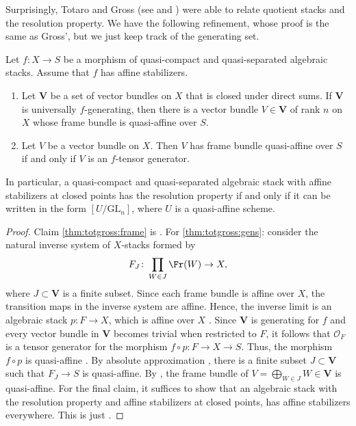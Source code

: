 \documentclass[reqno,a4paper]{amsart}
\numberwithin{Theorem}{section}
\newcommand{\Orb}{\mathcal{O}}
\newcommand{\Vect}{\mathbf{V}}
\renewcommand{\GL}{\mathrm{GL}}
\theoremstyle{plain}
\theoremstyle{remark}
\begin{document}
Surprisingly, Totaro and Gross (see \cite[Thm.\ 1.1]{MR2108211} and
\cite[Thm.\ 1.1, Thm.\ 6.10]{2013arXiv1306.5418G}) were able to relate
quotient stacks and the resolution property. We have the following
refinement, whose proof is the same as Gross', but we just keep track of
the generating set.
\begin{Theorem} \label{thm:totgross} Let $f \colon X \to S$ be a
  morphism of quasi-compact and quasi-separated algebraic
  stacks. Assume that $f$ has affine stabilizers.
  \begin{enumerate}
  \item  \label{thm:totgross:gens} Let $\Vect$ be a set of vector bundles on $X$ that is closed
    under direct sums. If $\Vect$ is universally $f$-generating, then there is a
    vector bundle $V\in \Vect$ of rank $n$ on $X$ whose frame bundle
    is quasi-affine over $S$. 
  \item \label{thm:totgross:frame} Let $V$ be a vector bundle on
    $X$. Then $V$ has frame bundle quasi-affine over $S$ if and only
    if $V$ is an $f$-tensor generator.
  \end{enumerate}
In particular, a quasi-compact and quasi-separated
    algebraic stack with affine stabilizers at closed points has the resolution
    property if and only if it can be written in the form $[U/\GL_n]$,
    where $U$ is a quasi-affine scheme.
\end{Theorem}
\begin{proof}
  Claim \eqref{thm:totgross:frame} is \cite[Thm.\
  6.4]{2013arXiv1306.5418G}. For \eqref{thm:totgross:gens}: consider the
  natural inverse system of $X$-stacks formed by
  \[
    F_J\colon \prod_{W \in J} \Fr(W) \to X,
  \]
  where $J \subset \Vect$ is a finite subset. Since each frame bundle
  is affine over $X$, the transition maps in the inverse system are
  affine. Hence, the inverse limit is an algebraic stack
  $p\colon F \to X$, which is affine over $X$ \cite[Thm.\
  C(i)]{rydh-2009}. Since $\Vect$ is generating for $f$ and every
  vector bundle in $\Vect$ becomes trivial when restricted to $F$, it
  follows that $\Orb_F$ is a tensor generator for the morphism
  $f \circ p \colon F \to X \to S$. Thus, the morphism $f\circ p$ is
  quasi-affine \cite[Prop.\ 4.1]{2013arXiv1306.5418G}. By
  absolute approximation \cite[Thm.\ C(i)]{rydh-2009}, there is a finite subset
  $J \subset \Vect$ such that $F_J \to S$ is quasi-affine. By
  \cite[Lem.\ 1.1]{rydh2009remarks}, the frame bundle of
  $V=\bigoplus_{W \in J} W \in \Vect$ is quasi-affine. For the final claim, it suffices to show that an algebraic stack with the resolution property and affine stabilizers at closed points, has affine stabilizers everywhere. This is just \cite[Lem.~5.15]{2013arXiv1306.5418G}.
\end{proof}
\end{document}

